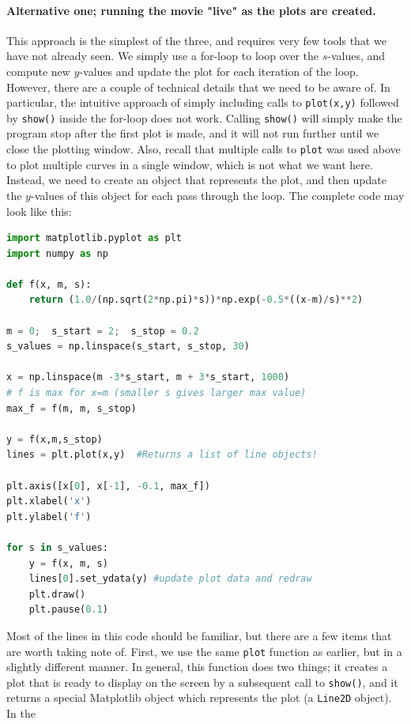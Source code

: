 \documentclass[graybox,envcountchap,sectrefs,final]{svmonodo}
\begin{document}
\paragraph{Alternative one; running the movie "live" as the plots are created.}
This approach is the simplest of the three, and requires very few tools that we have not already seen. We simply
use a for-loop to loop over the $s$-values, and compute new $y$-values and update the plot for each iteration
of the loop. However, there are a couple of technical details that we need to be aware of. In particular,
the intuitive approach of simply including calls to \texttt{plot(x,y)} followed by \texttt{show()} inside the for-loop
does not work. Calling \texttt{show()} will simply make the program stop after the first plot is made, and it will not
run further until we close the plotting window. Also, recall that multiple calls to \texttt{plot} was used above
to plot multiple curves in a single window, which is not what we want here. Instead, we need to create
an object that represents the plot, and then update the $y$-values of this object for each pass through the loop.
The complete code may look like this:
\begin{lstlisting}[language=Python,style=blue1]
import matplotlib.pyplot as plt
import numpy as np

def f(x, m, s):
    return (1.0/(np.sqrt(2*np.pi)*s))*np.exp(-0.5*((x-m)/s)**2)

m = 0;  s_start = 2;  s_stop = 0.2
s_values = np.linspace(s_start, s_stop, 30)

x = np.linspace(m -3*s_start, m + 3*s_start, 1000)
# f is max for x=m (smaller s gives larger max value)
max_f = f(m, m, s_stop)

y = f(x,m,s_stop)
lines = plt.plot(x,y)  #Returns a list of line objects!

plt.axis([x[0], x[-1], -0.1, max_f])
plt.xlabel('x')
plt.ylabel('f')

for s in s_values:
    y = f(x, m, s)
    lines[0].set_ydata(y) #update plot data and redraw
    plt.draw()
    plt.pause(0.1)
\end{lstlisting}
Most of the lines in this code should be familiar, but there are a few items that are worth taking
note of. First, we use the same \texttt{plot} function as earlier, but in a slightly different manner. In general,
this function
does two things; it creates a plot that is ready to display on the screen by a subsequent call to \texttt{show()},
and it returns a special Matplotlib object which represents the plot (a \texttt{Line2D} object). In the
\end{document}
